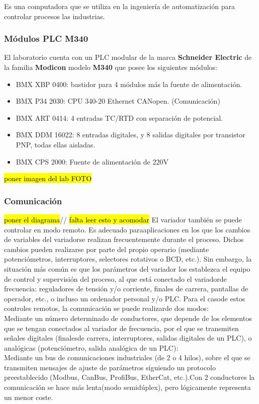 \begin{tcolorbox}[colback=blue!5!white,colframe=blue!75!black,title=PLC]
	Es una computadora que se utiliza en la ingeniería de automatización para controlar procesos las industrias.
\end{tcolorbox}

\subsubsection{Módulos PLC M340}
El laboratorio cuenta con un PLC modular de la marca \textbf{Schneider Electric} de la familia \textbf{Modicon} modelo \textbf{M340} que posee los siguientes módulos:
\begin{itemize}
	\item BMX XBP 0400: bastidor para 4 módulos más la fuente de alimentación.
	\item BMX P34 2030: CPU 340-20 Ethernet CANopen.   (Comunicación)
	\item BMX ART 0414: 4 entradas TC/RTD con separación de potencial.
	\item BMX DDM 16022: 8 entradas digitales, y 8 salidas digitales por transistor PNP, todas ellas aisladas.
	\item BMX CPS 2000: Fuente de alimentación de 220V
\end{itemize}
\hl{poner imagen del lab FOTO}



\subsubsection{Comunicación}
\hl{poner el diagrama}//
\hl{falta leer esto y acomodar}
El   variador   también   se   puede   controlar   en   modo   remoto.   Es   adecuado   paraaplicaciones en   los   que   los   cambios   de   variables   del   variadorse   realizan frecuentemente  durante  el proceso.  Dichos  cambios  pueden  realizarse  por  parte  del propio  operario  (mediante  potenciómetros,  interruptores,  selectores  rotativos  o  BCD, etc.).  Sin  embargo,  la  situación  más  común  es  que  los  parámetros  del  variador  los establezca  el  equipo  de  control  y  supervisión  del  proceso,  al  que  está  conectado  el variadorde  frecuencia: reguladores  de  tensión  y/o  corriente,  finales  de  carrera, pantallas de operador, etc., o incluso un ordenador personal y/o PLC. Para  el  casode  estos  controles  remotos,  la  comunicación  se  puede  realizarde  dos modos:\\Mediante un  número  determinado  de  conductores,  que  depende  de  los elementos que se tengan conectados al variador de frecuencia, por el que se transmiten señales digitales (finalesde carrera, interruptores, salidas digitales de un PLC), o analógicas (potenciómetro, salida analógica de un PLC):\\Mediante un bus de comunicaciones industriales (de 2 o 4 hilos), sobre el que se transmiten   mensajes   de   ajuste   de   parámetros   siguiendo   un   protocolo preestablecido (Modbus, CanBus, ProfiBus, EtherCat, etc.).Con 2  conductores la  comunicación  se  hace  más  lenta(modo  semidúplex),  pero  lógicamente representa un menor coste.

